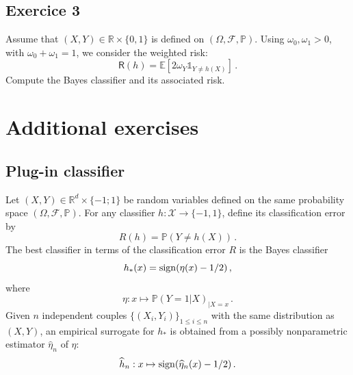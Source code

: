 \documentclass[a4paper,10pt,fleqn]{article}
\newcommand{\eqsp}{\,}
\newcommand{\calF}{\mathcal{F}}
\newcommand{\rset}{\ensuremath{\mathbb{R}}}
\newcommand{\bP}{\mathbb{P}}
\newcommand{\1}{\ensuremath{\mathbbm{1}}}
\newcommand{\bE}{\mathbb{E}}
\begin{document}
\subsection{Exercice 3}
Assume that $(X,Y)\in\mathbb{R}\times\{0,1\}$ is defined on $(\Omega,\mathcal{F},\mathbb{P})$. Using $\omega_0, \omega_1 >0$, with $\omega_0+\omega_1 = 1$, we  consider the weighted risk:
$$
\mathsf{R}(h) = \bE[2\omega_Y \mathds{1}_{Y\neq h(X)}]\,.
$$
 Compute the Bayes classifier and its associated risk.

\section{Additional exercises}
\subsection{Plug-in classifier}
Let $(X,Y)\in\rset^d\times\{-1;1\}$ be random variables defined on the same probability space $(\Omega,\calF,\bP)$.
For any classifier $h:\mathcal{X}\to \{-1,1\}$, define its classification error by
$$
R(h)=\bP(Y\neq h(X))\eqsp.
$$
The best classifier in terms of the classification error $R$ is the Bayes classifier
$$
h_{*}(x)={\rm sign}(\eta(x)-1/2)\eqsp,
$$
where
$$
\eta:x \mapsto\bP(Y=1|X)_{|X=x}\eqsp.
$$
Given $n$ independent couples $\{(X_i,Y_i)\}_{1\leqslant i \leqslant n}$ with the same distribution as $(X,Y)$, an empirical surrogate for $h_{*}$ is obtained from a possibly nonparametric estimator $\widehat \eta_n$ of $\eta$:
$$
\widehat h_n: x\mapsto {\rm sign}(\widehat \eta_n(x)-1/2)\eqsp.
$$
\end{document}
